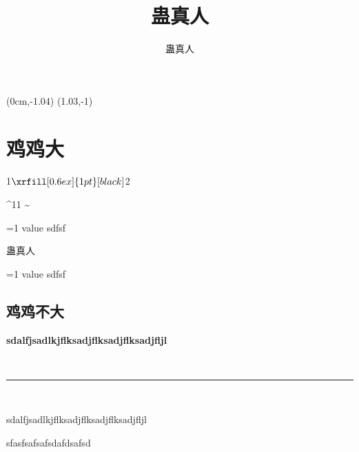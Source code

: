\documentclass[hyperref,UTF8]{ctexrep}
\title{蛊真人}
\author{蛊真人}
\newenvironment{thisBody}
	{
		\zihao{3}
	}%
	{
		\clearpage
	}%
\begin{document}
\fancyput*(0cm,-1.04\textheight){ \setlength\fboxsep{0pt} \noindent\framebox[1.03\textwidth]{ \noindent \rule{0cm}{ 1.04\textheight } } }
\fancyput*(1.03\textwidth,-1\textheight){ \setlength\fboxsep{0pt} \noindent\framebox[2cm]{ \noindent \rule{0cm}{ \textheight } } }

 
\maketitle%
 

 


\newcommand\testvvvv[1]{ \ifnum #1=1 value \fi sdfsf }



\chapter{鸡鸡大}


 1$\xrfill[0.6ex]{1pt}[black]$2


\female
\mars
\male

\textdegree
\textasciicircum{}11
\textasciitilde{}
\textemdash\textemdash
 \newmoon
 \rightmoon
 \fullmoon
 \leftmoon



\testvvvv{1}

蛊真人

\testvvvv{0}

\setcounter{secnumdepth}{-2}
\section{鸡鸡不大}
\setcounter{secnumdepth}{3}

	\begin{thisBody} 
		\textbf {sdalfjsadlkjflksadjflksadjflksadjfljl}

\noindent \, \hfill \rule[0.5ex]{0.95\linewidth}{0.5pt} \hfill \,

\noindent		\dag \hfill sdalfjsadlkjflksadjflksadjflksadjfljl \hfill \dag 

		sfasfsafsafsdafdsafsd
	\end{thisBody}
\end{document}
